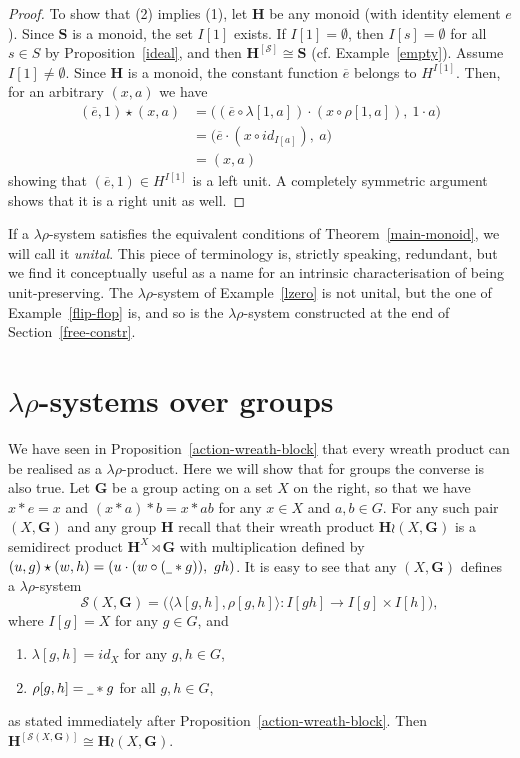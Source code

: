 \documentclass{amsart}
\newcommand{\bl}{\underline{\hspace{1ex}}}
\begin{document}
\begin{proof}
To show that (2) implies (1), let $\mathbf{H}$ be any monoid (with identity
element $e$). 
Since $\mathbf{S}$ is a monoid, the set $I[1]$ exists. If $I[1] = \emptyset$,
then $I[s]=\emptyset$ for all $s\in S$ by Proposition~\ref{ideal}, and
then $\mathbf{H}^{[\mathcal{S}]}\cong \mathbf{S}$ (cf. Example~\ref{empty}). 
Assume $I[1]\neq\emptyset$. Since $\mathbf{H}$ is a
monoid, the constant function $\overline{e}$ belongs to $H^{I[1]}$. 
Then, for an arbitrary $(x,a)$ we have 
\begin{align*}
(\overline{e},1)\star (x,a) &= \bigl((\overline{e}\circ\lambda[1,a])\cdot
                              (x\circ\rho[1,a]),\ 1\cdot a\bigr)\\ 
&= (\overline{e}\cdot (x\circ {id}_{I[a]}),\ a\bigr)\\
&= (x, a)
\end{align*}
showing that $(\overline{e},1)\in H^{I[1]}$ is a left unit. A completely
symmetric argument shows that it is a right unit as well. 
\end{proof}

If a $\lambda\rho$-system satisfies the equivalent conditions of
Theorem~\ref{main-monoid}, we will call it \emph{unital}. This piece of
terminology is, strictly speaking, 
redundant, but we find it conceptually useful as a name for an intrinsic
characterisation of being unit-preserving.
The $\lambda\rho$-system of Example~\ref{lzero} is not unital, but
the one of Example~\ref{flip-flop} is, and so is the $\lambda\rho$-system
constructed at the end of Section~\ref{free-constr}.

\section{$\lambda\rho$-systems over groups}\label{wreath}

We have seen in Proposition~\ref{action-wreath-block} that 
every wreath product can be realised as a $\lambda\rho$-product.
Here we will show that for groups the converse is also true.
Let $\mathbf{G}$ be a group acting on a set $X$ on the right, so that we have
$x\ast e = x$ and $(x\ast a)\ast b = x\ast ab$ for any $x\in X$ and
$a,b\in G$. For any such pair $(X,\mathbf G)$ and any group $\mathbf{H}$ recall that 
their wreath product $\mathbf H\wr (X,\mathbf G)$ is
a semidirect product $\mathbf{H}^X\rtimes  \mathbf{G}$ with multiplication
defined by $(u,g)\star(w,h)= (u\cdot (w\circ(\bl \ast g)),\ gh)$.
It is easy to see that any $(X,\mathbf G)$ defines a
$\lambda\rho$-system
$$
\mathcal{S}(X,\mathbf G) =
\bigl(\langle \lambda[g,h],\rho[g,h]\rangle\colon
I[gh]\to I[g]\times I[h]\bigr),
$$
where $I[g]=X$ for any $g\in G$, and 
\begin{enumerate}
\item $\lambda[g,h] = {id}_X$ for any $g,h\in G$,
\item $\rho[g,h] = \bl\ast g$ for all $g,h\in G$, 
\end{enumerate}
as stated immediately after Proposition~\ref{action-wreath-block}. Then 
$\mathbf H^{[\mathcal S(X,\mathbf G)]}\cong \mathbf{H}\wr (X,\mathbf G)$.
\end{document}
